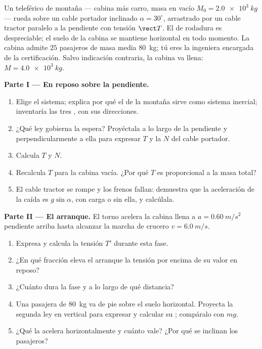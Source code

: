 \begin{problem}
\label{pb:g12:newtons-laws:1}
Un teleférico de montaña --- cabina más carro, masa en vacío
$M_0 = \qty{2.0e3}{kg}$ --- rueda sobre un cable portador inclinado
$\alpha = 30^\circ$, arrastrado por un cable tractor paralelo a la pendiente con
tensión $\vect T$. El  de rodadura es despreciable; el suelo de la cabina se
mantiene horizontal en todo momento. La cabina admite $25$ pasajeros de masa media
\qty{80}{kg}; tú eres la ingeniera encargada de la certificación. Salvo indicación
contraria, la cabina va llena: $M = \qty{4.0e3}{kg}$.

\medskip
\noindent\textbf{Parte I --- En reposo sobre la pendiente.}
\begin{enumerate}
  \item Elige el sistema; explica por qué el  de la montaña sirve
        como sistema inercial; inventaría las tres , con sus direcciones.
  \item ¿Qué ley gobierna la espera? Proyéctala a lo largo de la pendiente y
        perpendicularmente a ella para expresar $T$ y la  $N$ del cable
        portador.
  \item Calcula $T$ y $N$.
  \item Recalcula $T$ para la cabina vacía. ¿Por qué $T$ es proporcional a la masa
        total?
  \item El cable tractor se rompe y los frenos fallan: demuestra que la aceleración de
        la caída es $g \sin\alpha$, con carga o sin ella, y calcúlala.
\end{enumerate}

\medskip
\noindent\textbf{Parte II --- El arranque.} El torno acelera la cabina llena a
$a = \qty{0.60}{m/s^2}$ pendiente arriba hasta alcanzar la marcha de crucero
$v = \qty{6.0}{m/s}$.
\begin{enumerate}[resume]
  \item Expresa y calcula la tensión $T'$ durante esta fase.
  \item ¿En qué fracción eleva el arranque la tensión por encima de su valor en
        reposo?
  \item ¿Cuánto dura la fase y a lo largo de qué distancia?
  \item Una pasajera de \qty{80}{kg} va de pie sobre el suelo horizontal. Proyecta la
        segunda ley en vertical para expresar y calcular su ; compáralo
        con $mg$.
  \item ¿Qué  la acelera horizontalmente y cuánto vale? ¿Por qué se inclinan los
        pasajeros?
\end{enumerate}


\end{problem}
